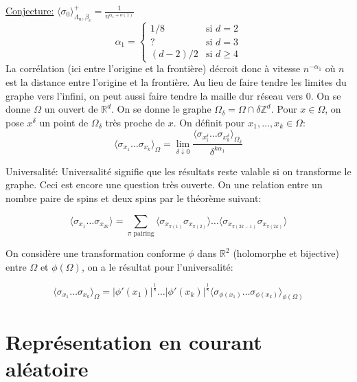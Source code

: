 \documentclass[a4paper,12pt]{report}
\begin{document}
\underline{Conjecture:} $\langle \sigma_0 \rangle^+_{\Lambda_n, \beta_c} = \frac{1}{n^{\alpha_1 + o(1)}}$
\newline
\begin{equation*}
\alpha_1 =
\begin{cases}
1/8 & \text{si } d=2 \\
? & \text{si } d=3 \\
(d-2)/2 & \text{si } d \geq 4
\end{cases}
\end{equation*}
\newline
La corrélation (ici entre l'origine et la frontière) décroit donc à vitesse $n^{-\alpha_1}$ où $n$ est la distance entre l'origine et la frontière.
\newline
\newline
Au lieu de faire tendre les limites du graphe vers l'infini, on peut aussi faire tendre la maille dur réseau vers 0. On se donne $\Omega$ un ouvert de $\mathbb{R}^d$. On se donne le graphe $\Omega_{\delta} = \Omega \cap \delta \mathbb{Z}^d$. Pour $x \in \Omega$, on pose $x^{\delta}$ un point de $\Omega_{\delta}$ très proche de $x$. On définit pour $x_1, \dots, x_k \in \Omega$:
$$
\langle \sigma_{x_1} \dots \sigma_{x_k} \rangle_{\Omega} = \lim_{\delta \downarrow 0} \frac{\langle \sigma_{x_1^{\delta}} \dots \sigma_{x_k^{\delta}} \rangle_{\Omega_{\delta}}}{\delta^{k\alpha_1}}
$$

Universalité:
Universalité signifie que les résultats reste valable si on transforme le graphe. Ceci est encore une question très ouverte.
On une relation entre un nombre paire de spins et deux spins par le théorème suivant:
\begin{thm}[Aizenman]
$$\langle \sigma_{x_1} \dots \sigma_{x_{2k}} \rangle = \sum_{\pi \text{ pairing}} \langle \sigma_{x_{\pi(1)}} \sigma_{x_{\pi(2)}} \rangle \dots \langle \sigma_{x_{\pi(2k-1)}}\sigma_{x_{\pi(2k)}} \rangle$$
\end{thm}
On considère une transformation conforme $\phi$ dans $\mathbb{R}^2$ (holomorphe et bijective) entre $\Omega$ et $\phi(\Omega)$, on a le résultat pour l'universalité:
\begin{thm}
$$\langle \sigma_{x_1} \dots \sigma_{x_k} \rangle_{\Omega} = |\phi'(x_1)|^{\frac{1}{8}}\dots |\phi'(x_k)|^{\frac{1}{8}} \langle \sigma_{\phi(x_1)} \dots \sigma_{\phi(x_k)} \rangle_{\phi(\Omega)}$$
\end{thm}

\section{Représentation en courant aléatoire}
\end{document}
